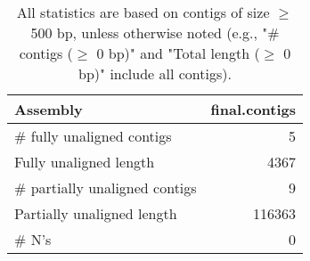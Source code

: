 \documentclass[12pt,a4paper]{article}
\begin{document}
\begin{table}[ht]
\begin{center}
\caption{All statistics are based on contigs of size $\geq$ 500 bp, unless otherwise noted (e.g., "\# contigs ($\geq$ 0 bp)" and "Total length ($\geq$ 0 bp)" include all contigs).}
\begin{tabular}{|l*{1}{|r}|}
\hline
Assembly & final.contigs \\ \hline
\# fully unaligned contigs & 5 \\ \hline
Fully unaligned length & 4367 \\ \hline
\# partially unaligned contigs & 9 \\ \hline
Partially unaligned length & 116363 \\ \hline
\# N's & 0 \\ \hline
\end{tabular}
\end{center}
\end{table}
\end{document}
